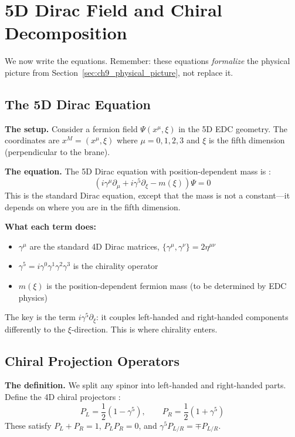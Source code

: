 \section{5D Dirac Field and Chiral Decomposition}
\label{sec:ch9_dirac}

We now write the equations. Remember: these equations \emph{formalize} the
physical picture from Section~\ref{sec:ch9_physical_picture}, not replace it.

\subsection{The 5D Dirac Equation}

\textbf{The setup.} Consider a fermion field $\Psi(x^\mu, \xi)$ in the 5D EDC geometry.
The coordinates are $x^M = (x^\mu, \xi)$ where $\mu = 0,1,2,3$ and $\xi$ is
the fifth dimension (perpendicular to the brane).

\textbf{The equation.} The 5D Dirac equation with position-dependent mass is \tagBL{}:
\begin{equation}
    \left( i\gamma^\mu \partial_\mu + i\gamma^5 \partial_\xi - m(\xi) \right) \Psi = 0
    \label{eq:ch9_5d_dirac}
\end{equation}
This is the standard Dirac equation, except that the mass is not a constant---it
depends on where you are in the fifth dimension.

\textbf{What each term does:}
\begin{itemize}[nosep]
    \item $\gamma^\mu$ are the standard 4D Dirac matrices, $\{\gamma^\mu, \gamma^\nu\} = 2\eta^{\mu\nu}$
    \item $\gamma^5 = i\gamma^0\gamma^1\gamma^2\gamma^3$ is the chirality operator
    \item $m(\xi)$ is the position-dependent fermion mass (to be determined by EDC physics)
\end{itemize}

The key is the term $i\gamma^5 \partial_\xi$: it couples left-handed and right-handed
components differently to the $\xi$-direction. This is where chirality enters.

\subsection{Chiral Projection Operators}

\textbf{The definition.} We split any spinor into left-handed and right-handed parts.
Define the 4D chiral projectors \tagBL{}:
\begin{equation}
    P_L = \frac{1}{2}(1 - \gamma^5), \qquad P_R = \frac{1}{2}(1 + \gamma^5)
    \label{eq:ch9_projectors}
\end{equation}
These satisfy $P_L + P_R = 1$, $P_L P_R = 0$, and $\gamma^5 P_{L/R} = \mp P_{L/R}$.

